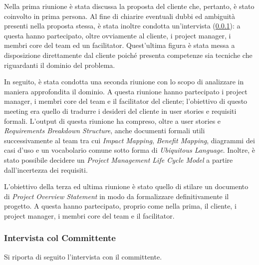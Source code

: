 Nella prima riunione è stata discussa la proposta del cliente che, pertanto, è stato coinvolto in prima persona.
Al fine di chiarire eventuali dubbi ed ambiguità presenti nella proposta stessa, è stata inoltre condotta un'intervista (\ref{sec:interview}): a questa hanno partecipato, oltre ovviamente al cliente, i project manager, i membri core del team ed un facilitator. Quest'ultima figura è stata messa a disposizione direttamente dal cliente poiché presenta competenze sia tecniche che riguardanti il dominio del problema.

In seguito, è stata condotta una seconda riunione con lo scopo di analizzare in maniera approfondita il dominio.
A questa riunione hanno partecipato i project manager, i membri core del team e il facilitator del cliente; l'obiettivo di questo meeting era quello di tradurre i desideri del cliente in user stories e requisiti formali.
L'output di questa riunione ha compreso, oltre a user stories e \textit{Requirements Breakdown Structure}, anche documenti formali utili successivamente al team tra cui \textit{Impact Mapping}, \textit{Benefit Mapping}, diagrammi dei casi d'uso e un vocabolario comune sotto forma di \textit{Ubiquitous Language}. Inoltre, è stato possibile decidere un \textit{Project Management Life Cycle Model} a partire dall'incertezza dei requisiti.

L'obiettivo della terza ed ultima riunione è stato quello di stilare un documento di \textit{Project Overview Statement} in modo da formalizzare definitivamente il progetto.
A questa hanno partecipato, proprio come nella prima, il cliente, i project manager, i membri core del team e il facilitator.

\subsubsection{Intervista col Committente}\label{sec:interview}
Si riporta di seguito l'intervista con il committente.


